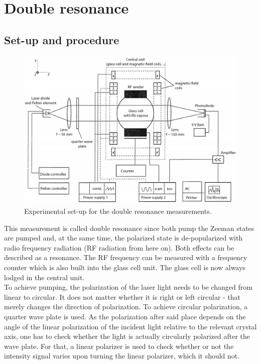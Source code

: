 \section{Double resonance}
\subsection{Set-up and procedure}
\begin{figure}[htb]
\centering
\includegraphics[width=1.0\linewidth]{graphics/doubleresonancesetup}
\caption[Double resonance set-up]{Experimental set-up for the double resonance measurements.\cite{anleitung}}
\label{fig:doubleresonancesetup}
\end{figure}
This measurement is called double resonance since both pump the Zeeman states are pumped and, at the same time, the polarized state is de-popularized with radio frequency radiation (RF radiation from here on). Both effects can be described as a resonance. The RF frequency can be measured with a frequency counter which is also built into the glass cell unit.  The glass cell is now always lodged in the central unit.\\
To achieve pumping, the polarization of the laser light needs to be changed from linear to circular. It does not matter whether it is right or left circular - that merely changes the direction of polarization. To achieve circular polarization, a quarter wave plate is used. As the polarization after said place depends on the angle of the linear polarization of the incident light relative to the relevant crystal axis, one has to check whether the light is actually circularly polarized after the wave plate. For that, a linear polarizer is used to check whether or not the intensity signal varies upon turning the linear polarizer, which it should not.\\ 
